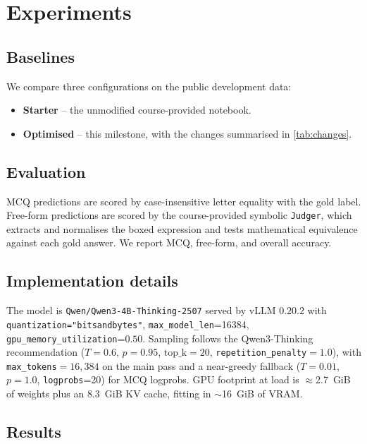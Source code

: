 \documentclass{article}
\begin{document}
\section{Experiments}
\label{sec:experiments}

\subsection{Baselines}
\label{sec:baselines}

We compare three configurations on the public development data:
\begin{itemize}
    \item \textbf{Starter} -- the unmodified course-provided notebook.
    \item \textbf{Optimised} -- this milestone, with the changes summarised
      in \cref{tab:changes}.
\end{itemize}

\subsection{Evaluation}
\label{sec:evaluation}

MCQ predictions are scored by case-insensitive letter equality with the gold
label. Free-form predictions are scored by the course-provided symbolic
\texttt{Judger}, which extracts and normalises the boxed expression and
tests mathematical equivalence against each gold answer. We report MCQ,
free-form, and overall accuracy.

\subsection{Implementation details}
\label{sec:implementation_details}

The model is \texttt{Qwen/Qwen3-4B-Thinking-2507} served by vLLM $0.20.2$
with \texttt{quantization="bitsandbytes"}, \texttt{max\_model\_len}=16384,
\texttt{gpu\_memory\_utilization}=$0.50$. Sampling follows the Qwen3-Thinking
recommendation ($T{=}0.6$, $p{=}0.95$, $\mathrm{top\_k}{=}20$,
\texttt{repetition\_penalty}$=1.0$), with \texttt{max\_tokens}$=16{,}384$ on
the main pass and a near-greedy fallback ($T{=}0.01$, $p{=}1.0$,
\texttt{logprobs}=20) for MCQ logprobs. GPU footprint at load is
$\approx$2.7~GiB of weights plus an $8.3$~GiB KV cache, fitting in
$\sim$16~GiB of VRAM. 

\subsection{Results}
\label{sec:results}
\end{document}
